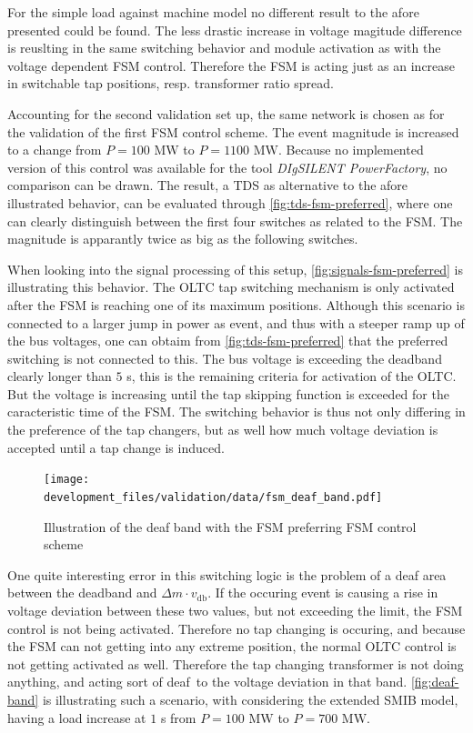 For the simple load against machine model no different result to the afore presented could be found.
The less drastic increase in voltage magitude difference is reuslting in the same switching behavior and module activation as with the voltage dependent \acs{FSM} control.
Therefore the \acs{FSM} is acting just as an increase in switchable tap positions, resp. transformer ratio spread.

Accounting for the second validation set up, the same network is chosen as for the validation of the first \acs{FSM} control scheme.
The event magnitude is increased to a change from $P=100\text{ MW}$ to $P=1100\text{ MW}$.
Because no implemented version of this control was available for the tool \textit{DIgSILENT PowerFactory}, no comparison can be drawn.
The result, a \acs{TDS} as alternative to the afore illustrated behavior, can be evaluated through \autoref{fig:tds-fsm-preferred}, where one can clearly distinguish between the first four switches as related to the \acs{FSM}.
The magnitude is apparantly twice as big as the following switches.

When looking into the signal processing of this setup, \autoref{fig:signals-fsm-preferred} is illustrating this behavior.
The \acs{OLTC} tap switching mechanism is only activated after the \acs{FSM} is reaching one of its maximum positions.
Although this scenario is connected to a larger jump in power as event, and thus with a steeper ramp up of the bus voltages, one can obtaim from \autoref{fig:tds-fsm-preferred} that the preferred switching is not connected to this.
The bus voltage is exceeding the deadband clearly longer than $5$ s, this is the remaining criteria for activation of the \acs{OLTC}.
But the voltage is increasing until the tap skipping function is exceeded for the caracteristic time of the \acs{FSM}.
The switching behavior is thus not only differing in the preference of the tap changers, but as well how much voltage deviation is accepted until a tap change is induced. 

\begin{figure}[htbp!]
    \centering
    \texttt{[image: development\_files/validation/data/fsm\_deaf\_band.pdf]}
    \caption[Illustration of the deaf band with the FSM preferring FSM control scheme]{Illustration of the deaf band with the FSM preferring FSM control scheme}
    \label{fig:deaf-band}
\end{figure}

One quite interesting error in this switching logic is the problem of a deaf area between the deadband and $\Delta m \cdot v_\mathrm{db}$.
If the occuring event is causing a rise in voltage deviation between these two values, but not exceeding the limit, the \acs{FSM} control is not being activated.
Therefore no tap changing is occuring, and because the \acs{FSM} can not getting into any extreme position, the normal \acs{OLTC} control is not getting activated as well.
Therefore the tap changing transformer is not doing anything, and acting sort of \glqq deaf\grqq~to the voltage deviation in that band.
\autoref{fig:deaf-band} is illustrating such a scenario, with considering the extended \acs{SMIB} model, having a load increase at $1$ s from $P=100\text{ MW}$ to $P=700\text{ MW}$.

